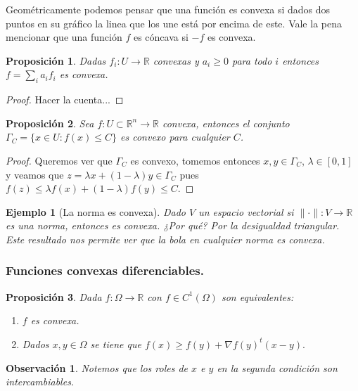 \documentclass[11pt]{article}
\theoremstyle{ejstyle}
\theoremstyle{ejstyle}
\theoremstyle{ejstyle}
\newtheorem{obs}{Observación}
\theoremstyle{ejstyle}
\newtheorem{ej}{Ejemplo}
\theoremstyle{ejstyle}
\newtheorem{prop}{Proposición}
\theoremstyle{ejstyle}
\theoremstyle{ejstyle}
\begin{document}
	Geométricamente podemos pensar que una función es convexa si dados dos puntos en su gráfico la linea que los une está por encima de este. Vale la pena mencionar que una función $f$ es cóncava si $-f$ es convexa.
	
	\begin{prop}
		Dadas $f_i : U \to \mathbb{R}$ convexas y $a_i \geq 0$ para todo $i$ entonces $f = \sum_{i} a_i f_i$ es convexa.
 	\end{prop}
 	
 	\begin{proof}
 		Hacer la cuenta...
 	\end{proof}
 	
 	\begin{prop}
 		Sea $f : U \subset \mathbb{R}^{n} \to \mathbb{R}$ convexa, entonces el conjunto $\Gamma_C = \{x \in U : f(x) \leq C\}$ es convexo para cualquier $C$. 
 	\end{prop}
	
	\begin{proof}
		Queremos ver que $\Gamma_C$ es convexo, tomemos entonces $x, y \in \Gamma_C$, $\lambda \in [0, 1]$ y veamos que $z = \lambda x + (1- \lambda)y \in \Gamma_C$ pues $f(z) \leq \lambda f(x) + (1- \lambda) f(y) \leq C.$ 
	\end{proof}
	
	\begin{ej}[La norma es convexa]
		Dado $V$ un espacio vectorial si $\|\cdot\| : V \to \mathbb{R}$ es una norma, entonces es convexa. ¿Por qué? Por la desigualdad triangular. 
		Este resultado nos permite ver que la bola en cualquier norma es convexa.
	\end{ej}
	
	\subsubsection{Funciones convexas diferenciables.}
	
	\begin{prop}
		Dada $f : \Omega \to \mathbb{R}$ con $f \in C^{1}(\Omega)$ son equivalentes:
		\begin{enumerate}
			\item $f$ es convexa.
			\item Dados $x, y \in \Omega$ se tiene que $f(x) \geq f(y) + \nabla f(y)^{t} (x - y).$
		\end{enumerate}
	\end{prop}
 	
 	\begin{obs}
 		Notemos que los roles de $x$ e $y$ en la segunda condición son intercambiables.
 	\end{obs}
 	
\end{document}
